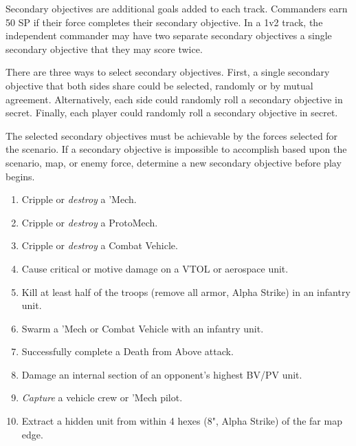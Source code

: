 Secondary objectives are additional goals added to each track.
Commanders earn 50 SP if their force completes their secondary objective.
In a 1v2 track, the independent commander may have two separate secondary objectives a single secondary objective that they may score twice.

There are three ways to select secondary objectives.
First, a single secondary objective that both sides share could be selected, randomly or by mutual agreement.
Alternatively, each side could randomly roll a secondary objective in secret.
Finally, each player could randomly roll a secondary objective in secret.

The selected secondary objectives must be achievable by the forces selected for the scenario.
If a secondary objective is impossible to accomplish based upon the scenario, map, or enemy force, determine a new secondary objective before play begins.

\begin{enumerate}

  \item Cripple or \emph{destroy} a 'Mech.

  \item Cripple or \emph{destroy} a ProtoMech.

  \item Cripple or \emph{destroy} a Combat Vehicle.

  \item Cause critical or motive damage on a VTOL or aerospace unit.

  \item Kill at least half of the troops (remove all armor, Alpha Strike) in an infantry unit.

  \item Swarm a 'Mech or Combat Vehicle with an infantry unit.

  \item Successfully complete a Death from Above attack.

  \item Damage an internal section of an opponent's highest BV/PV unit.

  \item \emph{Capture} a vehicle crew or 'Mech pilot.

  \item Extract a hidden unit from within 4 hexes (8", Alpha Strike) of the far map edge.

\end{enumerate}
